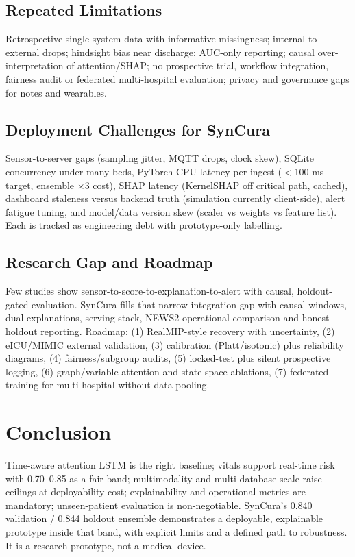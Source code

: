 \documentclass[a4paper,conference]{IEEEtran}
\begin{document}
\subsection{Repeated Limitations}
Retrospective single-system data with informative missingness; internal-to-external drops; hindsight bias near discharge; AUC-only reporting; causal over-interpretation of attention/SHAP; no prospective trial, workflow integration, fairness audit or federated multi-hospital evaluation; privacy and governance gaps for notes and wearables.

\subsection{Deployment Challenges for SynCura}
Sensor-to-server gaps (sampling jitter, MQTT drops, clock skew), SQLite concurrency under many beds, PyTorch CPU latency per ingest ($<$100 ms target, ensemble $\times$3 cost), SHAP latency (KernelSHAP off critical path, cached), dashboard staleness versus backend truth (simulation currently client-side), alert fatigue tuning, and model/data version skew (scaler vs weights vs feature list). Each is tracked as engineering debt with prototype-only labelling.

\subsection{Research Gap and Roadmap}
Few studies show sensor-to-score-to-explanation-to-alert with causal, holdout-gated evaluation. SynCura fills that narrow integration gap with causal windows, dual explanations, serving stack, NEWS2 operational comparison and honest holdout reporting. Roadmap: (1) RealMIP-style recovery with uncertainty, (2) eICU/MIMIC external validation, (3) calibration (Platt/isotonic) plus reliability diagrams, (4) fairness/subgroup audits, (5) locked-test plus silent prospective logging, (6) graph/variable attention and state-space ablations, (7) federated training for multi-hospital without data pooling.

\section{Conclusion}
Time-aware attention LSTM is the right baseline; vitals support real-time risk with 0.70--0.85 as a fair band; multimodality and multi-database scale raise ceilings at deployability cost; explainability and operational metrics are mandatory; unseen-patient evaluation is non-negotiable. SynCura's 0.840 validation / 0.844 holdout ensemble demonstrates a deployable, explainable prototype inside that band, with explicit limits and a defined path to robustness. It is a research prototype, not a medical device.
\end{document}
